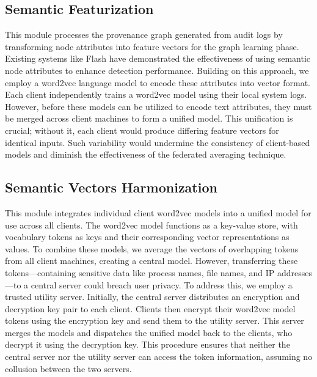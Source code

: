 \subsection{Semantic Featurization}
This module processes the provenance graph generated from audit logs by transforming node attributes into feature vectors for the graph learning phase. Existing systems like Flash have demonstrated the effectiveness of using semantic node attributes to enhance detection performance. Building on this approach, we employ a word2vec language model to encode these attributes into vector format. Each client independently trains a word2vec model using their local system logs. However, before these models can be utilized to encode text attributes, they must be merged across client machines to form a unified model. This unification is crucial; without it, each client would produce differing feature vectors for identical inputs. Such variability would undermine the consistency of client-based \gnnshort models and diminish the effectiveness of the federated averaging technique.

\subsection{Semantic Vectors Harmonization}
This module integrates individual client word2vec models into a unified model for use across all clients. The word2vec model functions as a key-value store, with vocabulary tokens as keys and their corresponding vector representations as values. To combine these models, we average the vectors of overlapping tokens from all client machines, creating a central model. However, transferring these tokens—containing sensitive data like process names, file names, and IP addresses—to a central server could breach user privacy. To address this, we employ a trusted utility server. Initially, the central server distributes an encryption and decryption key pair to each client. Clients then encrypt their word2vec model tokens using the encryption key and send them to the utility server. This server merges the models and dispatches the unified model back to the clients, who decrypt it using the decryption key. This procedure ensures that neither the central server nor the utility server can access the token information, assuming no collusion between the two servers.


